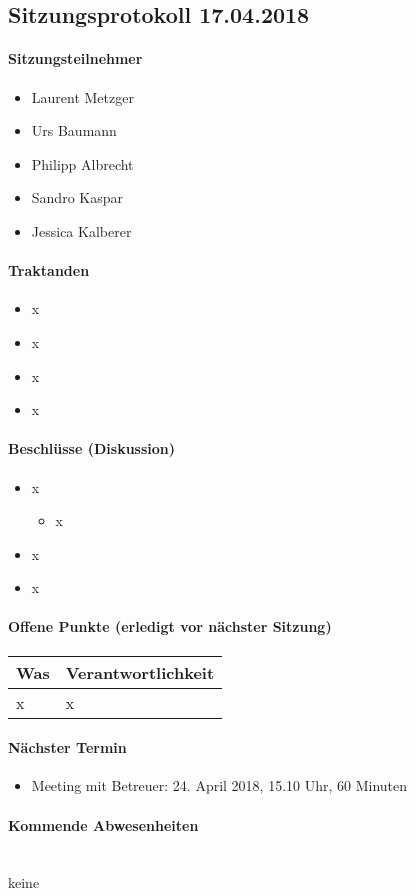 \subsection{Sitzungsprotokoll 17.04.2018}

\paragraph{Sitzungsteilnehmer}
\begin{itemize}	
	\item Laurent Metzger 
	\item Urs Baumann
	\item Philipp Albrecht
	\item Sandro Kaspar
	\item Jessica Kalberer
\end{itemize}

\paragraph{Traktanden}
\begin{itemize}	
	\item x
	\item x
	\item x
	\item x
\end{itemize}

\paragraph{Beschlüsse (Diskussion)}
\begin{itemize}	
	\item x
	\begin{itemize}
		\item x
	\end{itemize}
	\item x
	\item x
\end{itemize}

\paragraph{Offene Punkte (erledigt vor nächster Sitzung)} \mbox{}

\begin{table}[H]
	\centering
	\begin{tabularx}{\textwidth}{X | p{4.5cm}}
		\rowcolor{gray!50}
		\textbf{Was} & \textbf{Verantwortlichkeit} \\
		\hline
		x & x \\	
	\end{tabularx}
	\label{tab:my-label}
\end{table}

\paragraph{Nächster Termin}
\begin{itemize}	
	\item Meeting mit Betreuer: 24. April 2018, 15.10 Uhr, 60 Minuten
\end{itemize}

\paragraph{Kommende Abwesenheiten} \mbox{}\\
keine
